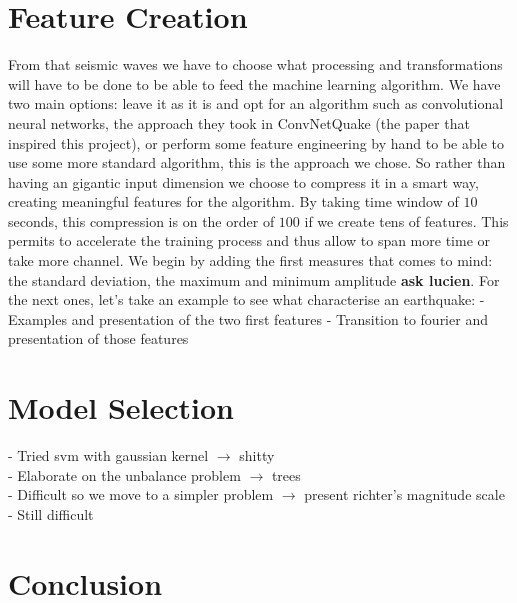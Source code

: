 \documentclass[10pt,conference,compsocconf]{IEEEtran}
\begin{document}
\section{Feature Creation}
From that seismic waves we have to choose what processing and transformations will have to be done to be able to feed the machine learning algorithm. We have two main options: leave it as it is and opt for an algorithm such as convolutional neural networks, the approach they took in ConvNetQuake (the paper \cite{ConvNetPaper} that inspired this project), or perform some feature engineering by hand to be able to use some more standard algorithm, this is the approach we chose. So rather than having an gigantic input dimension we choose to compress it in a smart way, creating meaningful features for the algorithm. By taking time window of $10$ seconds, this compression is on the order of $100$ if we create tens of features. This permits to accelerate the training process and thus allow to span more time or take more channel.\newline
We begin by adding the first measures that comes to mind: the standard deviation, the maximum and minimum amplitude \textbf{ask lucien}. For the next ones, let's take an example to see what characterise an earthquake:\newline
- Examples and presentation of the two first features
- Transition to fourier and presentation of those features

\section{Model Selection}
- Tried svm with gaussian kernel $\rightarrow$ shitty\\
- Elaborate on the unbalance problem $\rightarrow$ trees\\
- Difficult so we move to a simpler problem $\rightarrow$ present richter's magnitude scale\\
- Still difficult\\

\section{Conclusion}
\end{document}

